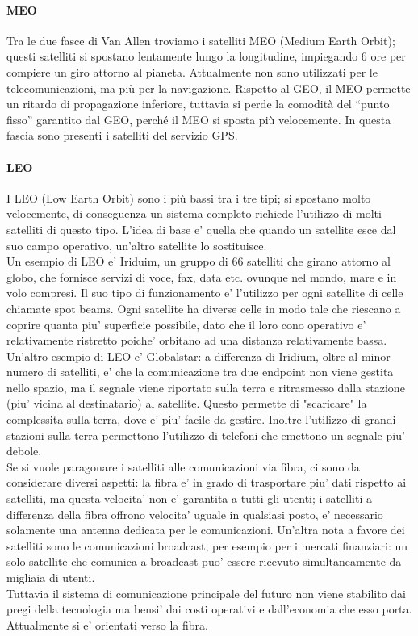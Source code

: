 \paragraph{MEO}
Tra le due fasce di Van Allen troviamo i satelliti MEO (Medium Earth Orbit); questi satelliti si spostano lentamente lungo la longitudine,
impiegando 6 ore per compiere un giro attorno al pianeta. Attualmente non sono utilizzati per le telecomunicazioni, ma più per la navigazione.
Rispetto al GEO, il MEO permette un ritardo di propagazione inferiore, tuttavia si perde la comodità del “punto fisso” garantito dal GEO, perché il MEO si sposta più velocemente. In questa fascia sono presenti i satelliti del servizio GPS.

\paragraph{LEO}
I LEO (Low Earth Orbit) sono i più bassi tra i tre tipi; si spostano molto velocemente, di conseguenza un sistema completo richiede l'utilizzo di molti satelliti di questo tipo. L'idea di base e' quella che quando un satellite esce dal suo campo operativo, un'altro satellite lo sostituisce. \\
Un esempio di LEO e' Iriduim, un gruppo di 66 satelliti che girano attorno al globo, che fornisce servizi di voce, fax, data etc. ovunque nel mondo, mare e in volo compresi. Il suo tipo di funzionamento e' l'utilizzo per ogni satellite di celle chiamate spot beams. Ogni satellite ha diverse celle in modo tale che riescano a coprire quanta piu' superficie possibile, dato che il loro cono operativo e' relativamente ristretto poiche' orbitano ad una distanza relativamente bassa.\\
Un'altro esempio di LEO e' Globalstar: a differenza di Iridium, oltre al minor numero di  satelliti, e' che la comunicazione tra due endpoint non viene gestita nello spazio, ma il segnale viene riportato sulla terra e ritrasmesso dalla stazione (piu' vicina al destinatario) al satellite. Questo permette di "scaricare" la complessita sulla terra, dove e' piu' facile da gestire. Inoltre l'utilizzo di grandi stazioni sulla terra permettono l'utilizzo di telefoni che emettono un segnale piu' debole.\\
Se si vuole paragonare i satelliti alle comunicazioni via fibra, ci sono da considerare diversi aspetti: la fibra e' in grado di trasportare piu' dati rispetto ai satelliti, ma questa velocita' non e' garantita a tutti gli utenti; i satelliti a differenza della fibra offrono velocita' uguale in qualsiasi posto, e' necessario solamente una antenna dedicata per le comunicazioni. Un'altra nota a favore dei satelliti sono le comunicazioni broadcast, per esempio per i mercati finanziari: un solo satellite che comunica a broadcast puo' essere ricevuto simultaneamente da migliaia di utenti.\\
Tuttavia il sistema di comunicazione principale del futuro non viene stabilito dai pregi della tecnologia ma bensi' dai costi operativi e dall'economia che esso porta. Attualmente si e' orientati verso la fibra.


